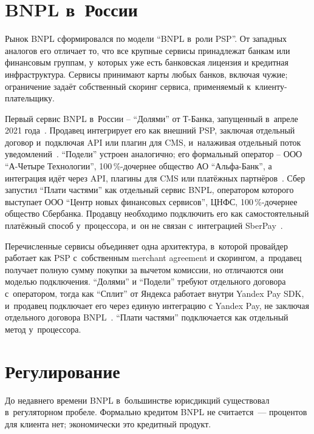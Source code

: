 \section{BNPL в~России}\label{sec:bnpl-russia}

Рынок BNPL сформировался по модели \enquote{BNPL
в~роли PSP}. От западных аналогов его отличает то, что все
крупные сервисы принадлежат банкам или финансовым
группам, у~которых уже есть банковская лицензия и кредитная
инфраструктура. Сервисы принимают карты любых банков, включая чужие; ограничение
задаёт собственный скоринг сервиса, применяемый к~клиенту-плательщику.

Первый сервис BNPL в~России -- \enquote{Долями} от Т-Банка,
запущенный в~апреле 2021 года~\cite{tbank-dolyame}. Продавец
интегрирует его как внешний PSP, заключая отдельный договор
и~подключая API или плагин для CMS, и~налаживая отдельный поток
уведомлений~\cite{tbank-dolyame-business}. \enquote{Подели}
устроен аналогично; его формальный оператор -- ООО
\enquote{А-Четыре Технологии}, 100\,\%-дочернее общество
АО \enquote{Альфа-Банк}, а интеграция идёт через API, плагины
для CMS или платёжных
партнёров~\cite{alfa-podeli,alfa-podeli-business}. Сбер запустил
\enquote{Плати частями} как отдельный сервис BNPL, оператором
которого выступает ООО \enquote{Центр новых финансовых
сервисов}, ЦНФС, 100\,\%-дочернее общество Сбербанка. Продавцу
необходимо подключить его как самостоятельный платёжный способ
у~процессора, и~он не связан с~интеграцией
SberPay~\cite{sber-pay-parts}.

Перечисленные сервисы объединяет одна архитектура, в~которой
провайдер работает как PSP с~собственным merchant agreement
и скорингом, а~продавец получает полную сумму покупки за вычетом
комиссии, но отличаются они моделью подключения. \enquote{Долями}
и \enquote{Подели} требуют отдельного договора с~оператором,
тогда как \enquote{Сплит} от Яндекса работает внутри Yandex Pay
SDK, и~продавец подключает его через единую интеграцию с Yandex
Pay, не заключая отдельного договора BNPL~\cite{yandex-split}.
\enquote{Плати частями} подключается как отдельный метод
у~процессора.

\section{Регулирование}\label{sec:bnpl-regulation}

До недавнего времени BNPL в~большинстве юрисдикций существовал
в~регуляторном пробеле. Формально кредитом BNPL не считается~---
процентов для клиента нет; экономически это кредитный продукт.

